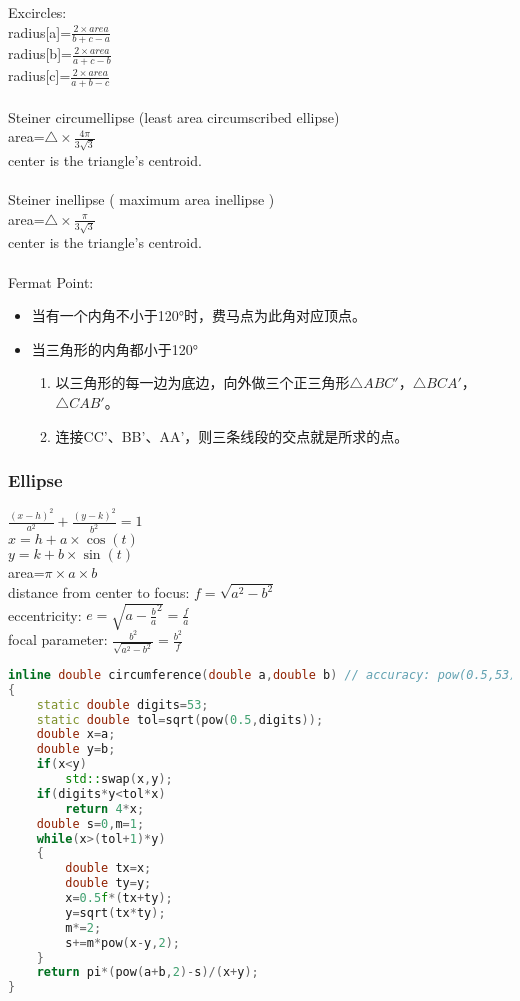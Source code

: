 Excircles:\\
radius[a]=$\frac{2\times area}{b+c-a}$\\
radius[b]=$\frac{2\times area}{a+c-b}$\\
radius[c]=$\frac{2\times area}{a+b-c}$\\
\\
Steiner circumellipse (least area circumscribed ellipse)\\
    area=$\triangle \times \frac{4\pi}{3\sqrt{3}}$\\
    center is the triangle's centroid.\\
\\
Steiner inellipse ( maximum area inellipse )\\
    area=$\triangle \times \frac{\pi}{3\sqrt{3}}$\\
    center is the triangle's centroid.\\
\\
Fermat Point:
\begin{itemize}
\item 当有一个内角不小于120°时，费马点为此角对应顶点。
\item 当三角形的内角都小于120°
\begin{enumerate}
\item 以三角形的每一边为底边，向外做三个正三角形$\triangle ABC'$，$\triangle BCA'$，$\triangle CAB'$。
\item 连接CC'、BB'、AA'，则三条线段的交点就是所求的点。
\end{enumerate}
\end{itemize}

\subsubsection{Ellipse}
$\frac{(x-h)^2}{a^2} + \frac{(y-k)^2}{b^2} = 1$\\

$x=h+a \times \cos(t)$\\
$y=k+b \times \sin(t)$\\

area=$\pi \times a \times b$\\
distance from center to focus: $f=\sqrt{a^2-b^2}$\\
eccentricity: $e=\sqrt{a-\frac{b}{a}^2}=\frac{f}{a}$\\
focal parameter: $\frac{b^2}{\sqrt{a^2-b^2}}=\frac{b^2}{f}$\\

\begin{lstlisting}[language=C++]
inline double circumference(double a,double b) // accuracy: pow(0.5,53);
{
    static double digits=53;
    static double tol=sqrt(pow(0.5,digits));
    double x=a;
    double y=b;
    if(x<y)
        std::swap(x,y);
    if(digits*y<tol*x)
        return 4*x;
    double s=0,m=1;
    while(x>(tol+1)*y)
    {
        double tx=x;
        double ty=y;
        x=0.5f*(tx+ty);
        y=sqrt(tx*ty);
        m*=2;
        s+=m*pow(x-y,2);
    }
    return pi*(pow(a+b,2)-s)/(x+y);
}
\end{lstlisting}

